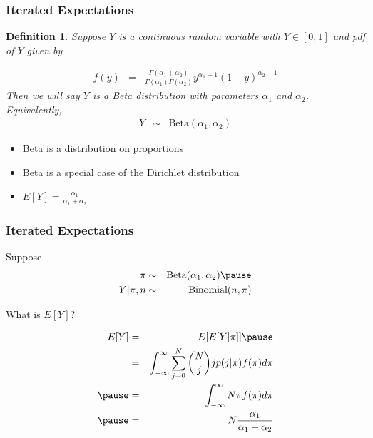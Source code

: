 \documentclass[handout]{beamer}
\newtheorem{defn}{Definition}
\numberwithin{equation}{section}
\begin{document}
\begin{frame}
\frametitle{Iterated Expectations}

\begin{defn}
Suppose $Y$ is a continuous random variable with $Y \in [0,1]$ and pdf of $Y$ given by 

\begin{eqnarray}
f(y) & = & \frac{\Gamma(\alpha_1 + \alpha_2)}{\Gamma(\alpha_{1} ) \Gamma(\alpha_{2})} y^{\alpha_{1} - 1} (1- y)^{\alpha_{2} - 1 } \nonumber 
\end{eqnarray}
 \pause
Then we will say $Y$ is a \alert{Beta} distribution with parameters $\alpha_{1}$ and $\alpha_{2}$.  Equivalently,
\begin{eqnarray}
Y & \sim & \text{Beta}(\alpha_{1}, \alpha_{2} ) \nonumber 
\end{eqnarray}



\end{defn}


\begin{itemize}
\item[-] Beta is a distribution on \alert{proportions}  \pause
\item[-] Beta is a special case of the \alert{Dirichlet} distribution  \pause
\item[-] $E[Y] = \frac{\alpha_{1}}{\alpha_{1} + \alpha_{2}}$
\end{itemize}


\end{frame}


\begin{frame}
\frametitle{Iterated Expectations}

Suppose 
\begin{eqnarray}
\pi & \sim & \text{Beta}(\alpha_{1}, \alpha_{2}) \nonumber \pause \\
Y|\pi, n & \sim & \text{Binomial}(n, \pi)\nonumber 
\end{eqnarray}

What is $E[Y]$? \pause 

\begin{eqnarray}
E[Y] & = & E[E[Y| \pi]] \nonumber \pause  \\ 
& = & \int_{-\infty}^{\infty} \sum_{j = 0}^{N} {{N}\choose{j}} j p(j|\pi) f(\pi) d\pi \nonumber \\ \pause 
& = & \int_{-\infty}^{\infty} N \pi f(\pi) d\pi \nonumber  \\ \pause 
& = & N \frac{\alpha_{1}}{\alpha_{1} + \alpha_{2}} \nonumber  
\end{eqnarray}


\end{frame}
\end{document}
